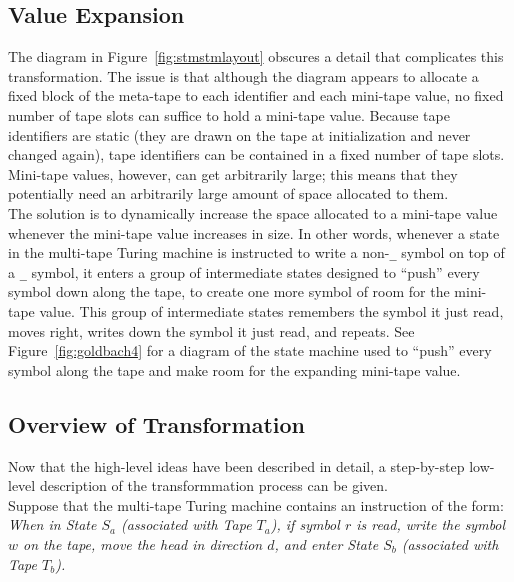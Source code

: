 \subsection{Value Expansion}

The diagram in Figure~\ref{fig:stmstmlayout} obscures a detail that complicates this transformation. The issue is that although the diagram appears to allocate a fixed block of the meta-tape to each identifier and each mini-tape value, no fixed number of tape slots can suffice to hold a mini-tape value. Because tape identifiers are static (they are drawn on the tape at initialization and never changed again), tape identifiers can be contained in a fixed number of tape slots. Mini-tape values, however, can get arbitrarily large; this means that they potentially need an arbitrarily large amount of space allocated to them. \\

The solution is to dynamically increase the space allocated to a mini-tape value whenever the mini-tape value increases in size. In other words, whenever a state in the multi-tape Turing machine is instructed to write a non-\texttt{\_} symbol on top of a \texttt{\_} symbol, it enters a group of intermediate states designed to ``push'' every symbol down along the tape, to create one more symbol of room for the mini-tape value. This group of intermediate states remembers the symbol it just read, moves right, writes down the symbol it just read, and repeats. See Figure~\ref{fig:goldbach4} for a diagram of the state machine used to ``push'' every symbol along the tape and make room for the expanding mini-tape value. \\

\subsection{Overview of Transformation \label{mttoststeps}}

Now that the high-level ideas have been described in detail, a step-by-step low-level description of the transformmation process can be given. \\

Suppose that the multi-tape Turing machine contains an instruction of the form: \\

\emph{When in State $S_a$ (associated with Tape $T_a$), if symbol $r$ is read, write the symbol $w$ on the tape, move the head in direction $d$, and enter State $S_b$ (associated with Tape $T_b$).} \\

